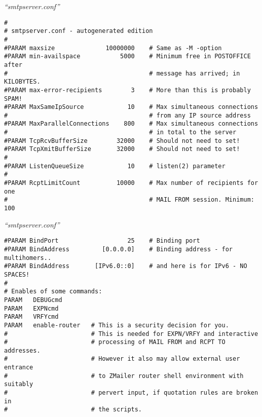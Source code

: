 \documentclass[a4paper,landscape]{slides}
\begin{document}
\begin{overlay}
\small
\centerline{{\em ``smtpserver.conf''}}
\tiny

\begin{verbatim}
#
# smtpserver.conf - autogenerated edition
#
#PARAM maxsize              10000000    # Same as -M -option
#PARAM min-availspace           5000    # Minimum free in POSTOFFICE after
#                                       # message has arrived; in KILOBYTES.
#PARAM max-error-recipients        3    # More than this is probably SPAM!
#PARAM MaxSameIpSource            10    # Max simultaneous connections
#                                       # from any IP source address
#PARAM MaxParallelConnections    800    # Max simultaneous connections
#                                       # in total to the server
#PARAM TcpRcvBufferSize        32000    # Should not need to set!
#PARAM TcpXmitBufferSize       32000    # Should not need to set!
#
#PARAM ListenQueueSize            10    # listen(2) parameter
#
#PARAM RcptLimitCount          10000    # Max number of recipients for one
#                                       # MAIL FROM session. Minimum: 100
\end{verbatim}
\vfill
\end{overlay}
\begin{overlay}
\small
\centerline{{\em ``smtpserver.conf''}}
\tiny
\begin{verbatim}
#PARAM BindPort                   25    # Binding port
#PARAM BindAddress         [0.0.0.0]    # Binding address - for multihomers..
#PARAM BindAddress       [IPv6.0::0]    # and here is for IPv6 - NO SPACES!
#
# Enables of some commands:
PARAM   DEBUGcmd
PARAM   EXPNcmd
PARAM   VRFYcmd
PARAM   enable-router   # This is a security decision for you.
#                       # This is needed for EXPN/VRFY and interactive
#                       # processing of MAIL FROM and RCPT TO addresses.
#                       # However it also may allow external user entrance
#                       # to ZMailer router shell environment with suitably
#                       # pervert input, if quotation rules are broken in
#                       # the scripts.
\end{verbatim}
\vfill
\end{overlay}
\end{document}
